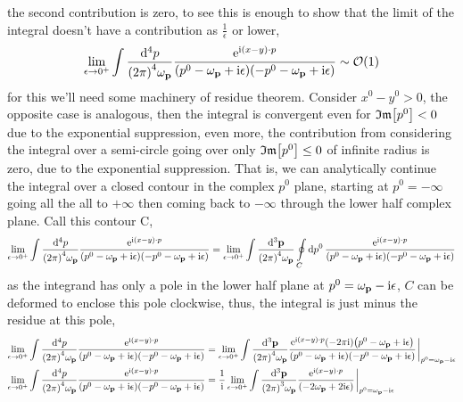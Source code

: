 the second contribution is zero, to see this is enough to show that the limit of the integral doesn't have a contribution as $\frac1\epsilon$ or lower,
\begin{align}
    \lim\limits_{\epsilon\rightarrow 0^+}\int\frac{\dd[4]{ p}}{\qty(2\pi)^4\omega_{\vb p}}\frac{\textnormal{e}^{\textnormal{i} \qty(x- y)\cdot p}}{\qty(p^0-\omega_{\vb p}+\textnormal{i}\epsilon)\qty(-p^0-\omega_{\vb p}+\textnormal{i}\epsilon)}\sim\mathcal O\qty(1)
\end{align}
for this we'll need some machinery of residue theorem. Consider $x^0-y^0>0$, the opposite case is analogous, then the integral is convergent even for $\mathfrak{Im}\qty[p^0]<0$ due to the exponential suppression, even more, the contribution 
from considering the integral over a semi-circle going over only $\mathfrak{Im}\qty[p^0]\leq0$ of infinite radius is zero, due to the exponential suppression. That is, we can analytically continue the integral over a closed contour in the complex 
$p^0$ plane, starting at $p^0=-\infty$ going all the all to $+\infty$ then coming back to $-\infty$ through the lower half complex plane. Call this contour C,
\begin{align}
    \lim\limits_{\epsilon\rightarrow 0^+}\int\frac{\dd[4]{ p}}{\qty(2\pi)^4\omega_{\vb p}}\frac{\textnormal{e}^{\textnormal{i} \qty(x- y)\cdot p}}{\qty(p^0-\omega_{\vb p}+\textnormal{i}\epsilon)\qty(-p^0-\omega_{\vb p}+\textnormal{i}\epsilon)}=\lim\limits_{\epsilon\rightarrow 0^+}\int\frac{\dd[3]{\vb p}}{\qty(2\pi)^4\omega_{\vb p}}\oint\limits_{C}\dd{p^0}\frac{\textnormal{e}^{\textnormal{i} \qty(x- y)\cdot p}}{\qty(p^0-\omega_{\vb p}+\textnormal{i}\epsilon)\qty(-p^0-\omega_{\vb p}+\textnormal{i}\epsilon)}
\end{align}
as the integrand has only a pole in the lower half plane at $p^0=\omega_{\vb p}-\textnormal{i}\epsilon$, $C$ can be deformed to enclose this pole clockwise, thus, the integral is just minus the residue at this pole,
\begin{align}
    \lim\limits_{\epsilon\rightarrow 0^+}\int\frac{\dd[4]{ p}}{\qty(2\pi)^4\omega_{\vb p}}\frac{\e^{\im \qty(x- y)\cdot p}}{\qty(p^0-\omega_{\vb p}+\im\epsilon)\qty(-p^0-\omega_{\vb p}+\im\epsilon)}&=\lim\limits_{\epsilon\rightarrow 0^+}\int\frac{\dd[3]{\vb p}}{\qty(2\pi)^4\omega_{\vb p}}\frac{\e^{\im \qty(x- y)\cdot p}\qty(-2\pi\im)\qty(p^0-\omega_{\vb p}+\im\epsilon)}{\qty(p^0-\omega_{\vb p}+\im\epsilon)\qty(-p^0-\omega_{\vb p}+\im\epsilon)}\eval_{p^0=\omega_{\vb p}-\im\epsilon}\\
    \lim\limits_{\epsilon\rightarrow 0^+}\int\frac{\dd[4]{ p}}{\qty(2\pi)^4\omega_{\vb p}}\frac{\e^{\im \qty(x- y)\cdot p}}{\qty(p^0-\omega_{\vb p}+\im\epsilon)\qty(-p^0-\omega_{\vb p}+\im\epsilon)}&=\frac1\im\lim\limits_{\epsilon\rightarrow 0^+}\int\frac{\dd[3]{\vb p}}{\qty(2\pi)^3\omega_{\vb p}}\frac{\e^{\im \qty(x- y)\cdot p}}{\qty(-2\omega_{\vb p}+2\im\epsilon)}\eval_{p^0=\omega_{\vb p}-\im\epsilon}
\end{align}
